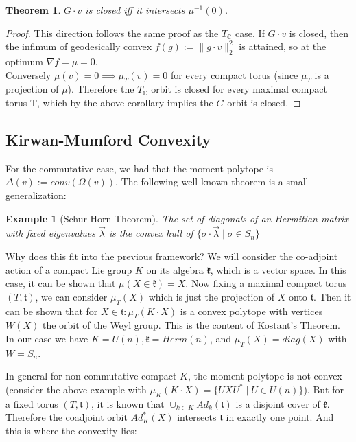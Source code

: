 \documentclass{article}
\newtheorem{theorem}{Theorem}
\newtheorem{example}{Example}
\newcommand{\C}{{\mathbb{C}}}
\begin{document}
\begin{theorem}
$G \cdot v$ is closed iff it intersects $\mu^{-1}(0)$. 
\end{theorem}
\begin{proof}
This direction follows the same proof as the $T_{\C}$ case. If $G \cdot v$ is closed, then the infimum of geodesically convex $f(g) := \|g \cdot v\|_{2}^{2}$ is attained, so at the optimum $\nabla f = \mu = 0$. 
\\ Conversely $\mu(v) = 0 \implies \mu_{T}(v) = 0$ for every compact torus (since $\mu_{T}$ is a projection of $\mu$). Therefore the $T_{\C}$ orbit is closed for every maximal compact torus T, which by the above corollary implies the $G$ orbit is closed. 
\end{proof}

\subsection{Kirwan-Mumford Convexity}
For the commutative case, we had that the moment polytope is $\Delta(v) := conv(\Omega(v))$. The following well known theorem is a small generalization:

\begin{example} [Schur-Horn Theorem]
The set of diagonals of an Hermitian matrix with fixed eigenvalues $\vec{\lambda}$ is the convex hull of $\{\sigma \cdot \vec{\lambda} \mid \sigma \in S_{n}\}$
\end{example}
Why does this fit into the previous framework? We will consider the co-adjoint action of a compact Lie group $K$ on its algebra $\mathfrak{k}$, which is a vector space. In this case, it can be shown that $\mu(X \in \mathfrak{k}) = X$. Now fixing a maximal compact torus $(T,\mathfrak{t})$, we can consider $\mu_{T}(X)$ which is just the projection of $X$ onto $\mathfrak{t}$. Then it can be shown that for $X \in \mathfrak{t}: \mu_{T}(K \cdot X)$ is a convex polytope with vertices $W(X)$ the orbit of the Weyl group. This is the content of Kostant's Theorem. In our case we have $K = U(n), \mathfrak{k} = Herm(n)$, and $\mu_{T}(X) = diag(X)$ with $W = S_{n}$. 

In general for non-commutative compact $K$, the moment polytope is not convex (consider the above example with $\mu_{K}(K \cdot X) = \{U X U^{*} \mid U \in U(n)\}$). But for a fixed torus $(T,\mathfrak{t})$, it is known that $\cup_{k \in K} Ad_{k}(\mathfrak{t})$ is a disjoint cover of $\mathfrak{k}$. Therefore the coadjoint orbit $Ad_{K}^{*}(X)$ intersects $\mathfrak{t}$ in exactly one point. And this is where the convexity lies:
\end{document}
